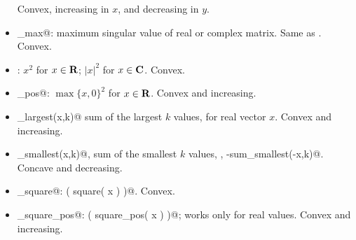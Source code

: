 \documentclass[12pt]{article}
\begin{document}
\begin{itemize}
Convex, increasing in $x$, and decreasing in $y$.
\item \verb@sigma_max@: maximum singular value of real or 
complex matrix.  Same as \verb@norm@.  Convex.
\item \verb@square@: $x^2$ for $x \in \R$;
$|x|^2$ for $x \in \mathbf{C}$.
Convex.
\item \verb@square_pos@: $\max\{x,0\}^2$ for $x\in\R$.
Convex and increasing.
\item \verb@sum_largest(x,k)@ sum of the largest $k$ values, for
real vector $x$.
Convex and increasing.
\item \verb@sum_smallest(x,k)@, sum of the smallest $k$ values,
\ie, \verb@-sum_smallest(-x,k)@.
Concave and decreasing.
\item \verb@sum_square@: \verb@sum( square( x ) )@. Convex.
\item \verb@sum_square_pos@: \verb@sum( square_pos( x ) )@; 
works only for real values. Convex and increasing.
\end{itemize}

\end{document}
